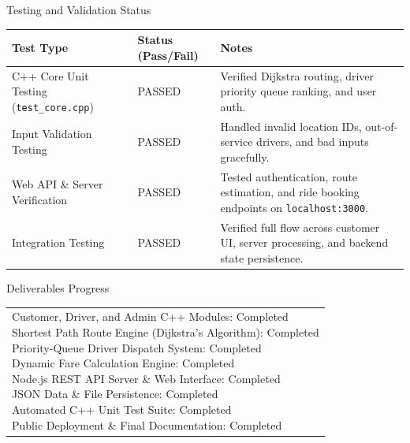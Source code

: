 \documentclass[12pt,a4paper]{article}
\newcommand{\sectiontitle}[1]{%
    {\color{GEUBlue}
    \fontsize{18}{22}\selectfont #1}
}
\newcommand{\answerbox}[2]{%
    \begin{tabularx}{\textwidth}{
        |>{\RaggedRight\arraybackslash}X|}
        \hline
        \parbox[t][#1][t]{\dimexpr\linewidth-12pt\relax}{
            \vspace{5pt}
            \fontsize{11}{13}\selectfont #2
        }\\
        \hline
    \end{tabularx}
}
\begin{document}
\sectiontitle{Testing and Validation Status}

\vspace{0.05cm}
\vspace{0.30cm}

\begin{tabularx}{\textwidth}{
|>{\RaggedRight\arraybackslash}p{}
|>{\RaggedRight\arraybackslash}p{}
|>{\RaggedRight\arraybackslash}X|
}
\hline

\textbf{Test Type} &
\textbf{Status (Pass/Fail)} &
\textbf{Notes}
\\
\hline

C++ Core Unit Testing (\texttt{test\_core.cpp})
&
PASSED
&
Verified Dijkstra routing, driver priority queue ranking, and user auth.
\\
\hline

Input Validation Testing
&
PASSED
&
Handled invalid location IDs, out-of-service drivers, and bad inputs gracefully.
\\
\hline

Web API \& Server Verification
&
PASSED
&
Tested authentication, route estimation, and ride booking endpoints on \texttt{localhost:3000}.
\\
\hline

Integration Testing
&
PASSED
&
Verified full flow across customer UI, server processing, and backend state persistence.
\\
\hline

\end{tabularx}

\vspace{0.65cm}

\sectiontitle{Deliverables Progress}

\vspace{0.05cm}

\vspace{0.25cm}

\answerbox{6.20cm}{
Customer, Driver, and Admin C++ Modules: Completed\\[2pt]
Shortest Path Route Engine (Dijkstra's Algorithm): Completed\\[2pt]
Priority-Queue Driver Dispatch System: Completed\\[2pt]
Dynamic Fare Calculation Engine: Completed\\[2pt]
Node.js REST API Server \& Web Interface: Completed\\[2pt]
JSON Data \& File Persistence: Completed\\[2pt]
Automated C++ Unit Test Suite: Completed\\[2pt]
Public Deployment \& Final Documentation: Completed
}
\end{document}
